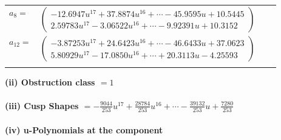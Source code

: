 \documentclass[1p]{elsarticle_modified}
\theoremstyle{definition}
\begin{document}
\begin{tabular}{m{7pt} m{180pt} m{7pt} m{180pt} }
\flushright $a_{8}=$&$\begin{pmatrix}-12.6947 u^{17}+37.8874 u^{16}+\cdots-45.9595 u+10.5445\\2.59783 u^{17}-3.06522 u^{16}+\cdots-9.92391 u+10.3152\end{pmatrix}$ \\
\flushright $a_{12}=$&$\begin{pmatrix}-3.87253 u^{17}+24.6423 u^{16}+\cdots-46.6433 u+37.0623\\5.80929 u^{17}-17.0850 u^{16}+\cdots+20.3113 u-4.25593\end{pmatrix}$\\&\end{tabular}
\flushleft \textbf{(ii) Obstruction class $= 1$}\\~\\
\flushleft \textbf{(iii) Cusp Shapes $= -\frac{9044}{253} u^{17}+\frac{28784}{253} u^{16}+\cdots-\frac{39132}{253} u+\frac{7280}{253}$}\\~\\
\newpage\renewcommand{\arraystretch}{1}
\flushleft \textbf{(iv) u-Polynomials at the component}\newline \\
\end{document}
